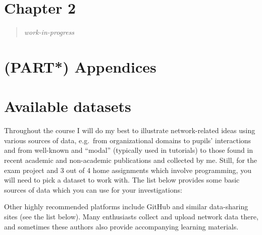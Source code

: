 \documentclass[
]{book}
\begin{document}
\chapter*{\texorpdfstring{\textbf{Chapter 2}}{Chapter 2}}\label{chapter-2}

\begin{quote}
\emph{work-in-progress }
\end{quote}

\chapter*{\texorpdfstring{(PART*) \textbf{Appendices}}{(PART*) Appendices}}\label{part-appendices}

\chapter*{\texorpdfstring{\textbf{Available datasets}}{Available datasets}}\label{available-datasets}

Throughout the course I will do my best to illustrate network-related ideas using various sources of data, e.g.~from organizational domains to pupils' interactions and from well-known and ``modal'' (typically used in tutorials) to those found in recent academic and non-academic publications and collected by me. Still, for the exam project and 3 out of 4 home assignments which involve programming, you will need to pick a dataset to work with. The list below provides some basic sources of data which you can use for your investigations:

Other highly recommended platforms include GitHub and similar data-sharing sites (see the list below). Many enthusiasts collect and upload network data there, and sometimes these authors also provide accompanying learning materials.
\end{document}
